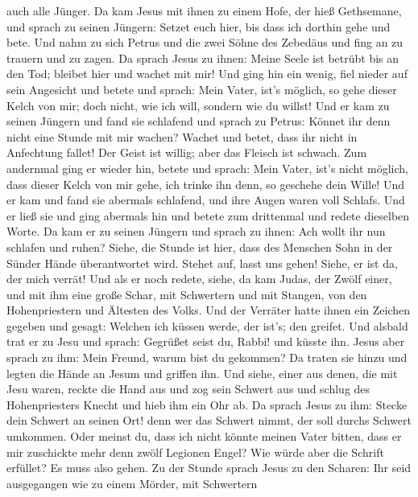 auch alle Jünger.  Da kam Jesus mit ihnen zu einem Hofe,
der hieß Gethsemane, und sprach zu seinen Jüngern: Setzet euch hier, bis
dass ich dorthin gehe und bete.  Und nahm zu sich Petrus
und die zwei Söhne des Zebedäus und fing an zu trauern und zu zagen.
 Da sprach Jesus zu ihnen: Meine Seele ist betrübt bis an
den Tod; bleibet hier und wachet mit mir!  Und ging hin ein
wenig, fiel nieder auf sein Angesicht und betete und sprach: Mein Vater,
ist's möglich, so gehe dieser Kelch von mir; doch nicht, wie ich will,
sondern wie du willst!  Und er kam zu seinen Jüngern und
fand sie schlafend und sprach zu Petrus: Könnet ihr denn nicht eine
Stunde mit mir wachen?  Wachet und betet, dass ihr nicht in
Anfechtung fallet! Der Geist ist willig; aber das Fleisch ist schwach.
 Zum andernmal ging er wieder hin, betete und sprach: Mein
Vater, ist's nicht möglich, dass dieser Kelch von mir gehe, ich trinke
ihn denn, so geschehe dein Wille!  Und er kam und fand sie
abermals schlafend, und ihre Augen waren voll Schlafs.  Und
er ließ sie und ging abermals hin und betete zum drittenmal und redete
dieselben Worte.  Da kam er zu seinen Jüngern und sprach zu
ihnen: Ach wollt ihr nun schlafen und ruhen? Siehe, die Stunde ist hier,
dass des Menschen Sohn in der Sünder Hände überantwortet wird.
 Stehet auf, lasst uns gehen! Siehe, er ist da, der mich
verrät!  Und als er noch redete, siehe, da kam Judas, der
Zwölf einer, und mit ihm eine große Schar, mit Schwertern und mit
Stangen, von den Hohenpriestern und Ältesten des Volks. 
Und der Verräter hatte ihnen ein Zeichen gegeben und gesagt: Welchen ich
küssen werde, der ist's; den greifet.  Und alsbald trat er
zu Jesu und sprach: Gegrüßet seist du, Rabbi! und küsste ihn.
 Jesus aber sprach zu ihm: Mein Freund, warum bist du
gekommen? Da traten sie hinzu und legten die Hände an Jesum und griffen
ihn.  Und siehe, einer aus denen, die mit Jesu waren,
reckte die Hand aus und zog sein Schwert aus und schlug des
Hohenpriesters Knecht und hieb ihm ein Ohr ab.  Da sprach
Jesus zu ihm: Stecke dein Schwert an seinen Ort! denn wer das Schwert
nimmt, der soll durchs Schwert umkommen.  Oder meinst du,
dass ich nicht könnte meinen Vater bitten, dass er mir zuschickte mehr
denn zwölf Legionen Engel?  Wie würde aber die Schrift
erfüllet? Es muss also gehen.  Zu der Stunde sprach Jesus
zu den Scharen: Ihr seid ausgegangen wie zu einem Mörder, mit Schwertern
